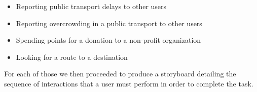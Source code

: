 \documentclass[a4paper, 11pt]{report}
\begin{document}
\begin{itemize}\label{list:tasks}
	\item Reporting public transport delays to other users
	\item Reporting overcrowding in a public transport to other users
	\item Spending points for a donation to a non-profit organization
	\item Looking for a route to a destination
\end{itemize}

For each of those we then proceeded to produce a storyboard detailing the sequence of
interactions that a user must perform in order to complete the task.


\begin{figure}[!h]
	\hfill
	\\
\end{figure}
\end{document}
